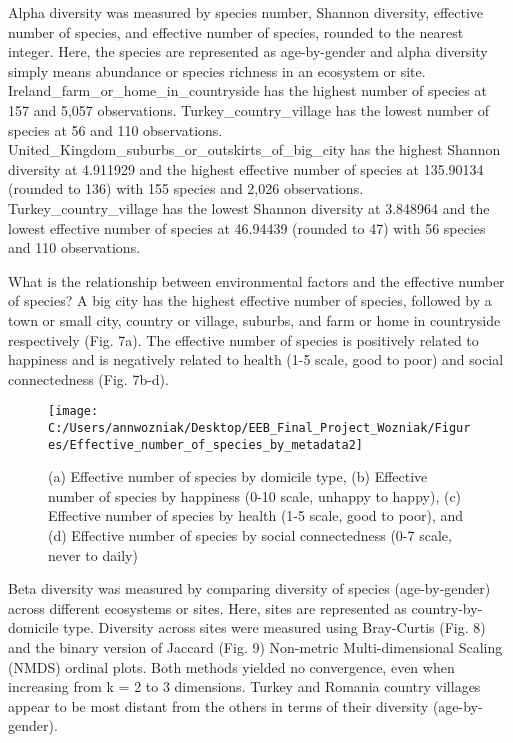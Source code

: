 Alpha diversity was measured by species number, Shannon diversity,
effective number of species, and effective number of species, rounded to
the nearest integer. Here, the species are represented as age-by-gender
and alpha diversity simply means abundance or species richness in an
ecosystem or site. Ireland\_farm\_or\_home\_in\_countryside has the
highest number of species at 157 and 5,057 observations.
Turkey\_country\_village has the lowest number of species at 56 and 110
observations. United\_Kingdom\_suburbs\_or\_outskirts\_of\_big\_city has
the highest Shannon diversity at 4.911929 and the highest effective
number of species at 135.90134 (rounded to 136) with 155 species and
2,026 observations. Turkey\_country\_village has the lowest Shannon
diversity at 3.848964 and the lowest effective number of species at
46.94439 (rounded to 47) with 56 species and 110 observations.

What is the relationship between environmental factors and the effective
number of species? A big city has the highest effective number of
species, followed by a town or small city, country or village, suburbs,
and farm or home in countryside respectively (Fig. 7a). The effective
number of species is positively related to happiness and is negatively
related to health (1-5 scale, good to poor) and social connectedness
(Fig. 7b-d).

\begin{Schunk}
\begin{figure}
\texttt{[image: C:/Users/annwozniak/Desktop/EEB\_Final\_Project\_Wozniak/Figures/Effective\_number\_of\_species\_by\_metadata2]} \caption[(a) Effective number of species by domicile type,  (b) Effective number of species by happiness (0-10 scale, unhappy to happy), (c) Effective number of species by health (1-5 scale, good to poor), and (d) Effective number of species by social connectedness (0-7 scale, never to daily)]{(a) Effective number of species by domicile type,  (b) Effective number of species by happiness (0-10 scale, unhappy to happy), (c) Effective number of species by health (1-5 scale, good to poor), and (d) Effective number of species by social connectedness (0-7 scale, never to daily)}\label{fig:fig.7}
\end{figure}
\end{Schunk}

Beta diversity was measured by comparing diversity of species
(age-by-gender) across different ecosystems or sites. Here, sites are
represented as country-by-domicile type. Diversity across sites were
measured using Bray-Curtis (Fig. 8) and the binary version of Jaccard
(Fig. 9) Non-metric Multi-dimensional Scaling (NMDS) ordinal plots. Both
methods yielded no convergence, even when increasing from k = 2 to 3
dimensions. Turkey and Romania country villages appear to be most
distant from the others in terms of their diversity (age-by-gender).


